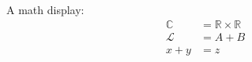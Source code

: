 \documentclass{article}
\begin{document}
A math display:
\begin{align}
\mathbb{C}&=\mathbb{R}\times\mathbb{R} \\
\mathcal{L}&=A+B\\
x+y&=z
\end{align}
\end{document}
